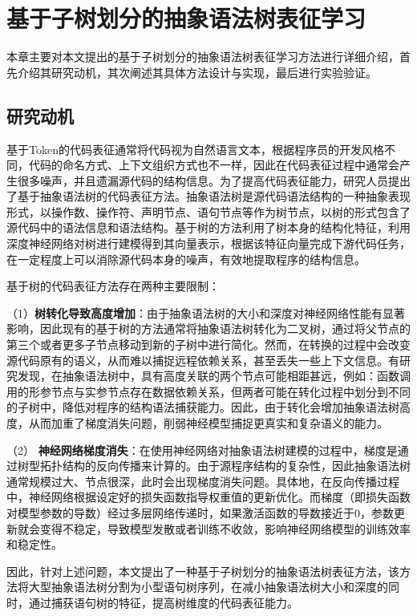 \chapter{基于子树划分的抽象语法树表征学习}
\label{chap:AST}
本章主要对本文提出的基于子树划分的抽象语法树表征学习方法进行详细介绍，首先介绍其研究动机，其次阐述其具体方法设计与实现，最后进行实验验证。

\section{研究动机}
\label{sec:ASTMotivation}
基于Token的代码表征通常将代码视为自然语言文本，根据程序员的开发风格不同，代码的命名方式、上下文组织方式也不一样，因此在代码表征过程中通常会产生很多噪声，并且遗漏源代码的结构信息。为了提高代码表征能力，研究人员提出了基于抽象语法树的代码表征方法。抽象语法树是源代码语法结构的一种抽象表现形式，以操作数、操作符、声明节点、语句节点等作为树节点，以树的形式包含了源代码中的语法信息和语法结构。基于树的方法利用了树本身的结构化特征，利用深度神经网络对树进行建模得到其向量表示，根据该特征向量完成下游代码任务，在一定程度上可以消除源代码本身的噪声，有效地提取程序的结构信息。

基于树的代码表征方法存在两种主要限制：

（1）\textbf{树转化导致高度增加}：由于抽象语法树的大小和深度对神经网络性能有显著影响，因此现有的基于树的方法通常将抽象语法树转化为二叉树，通过将父节点的第三个或者更多子节点移动到新的子树中进行简化。然而，在转换的过程中会改变源代码原有的语义，从而难以捕捉远程依赖关系，甚至丢失一些上下文信息。有研究发现\cite{Allamanis2017LearningTR}，在抽象语法树中，具有高度关联的两个节点可能相距甚远，例如：函数调用的形参节点与实参节点存在数据依赖关系，但两者可能在转化过程中划分到不同的子树中，降低对程序的结构语法捕获能力。因此，由于转化会增加抽象语法树高度，从而加重了梯度消失问题，削弱神经模型捕捉更真实和复杂语义的能力。

（2） \textbf{神经网络梯度消失}：在使用神经网络对抽象语法树建模的过程中，梯度是通过树型拓扑结构的反向传播来计算的。由于源程序结构的复杂性，因此抽象语法树通常规模过大、节点很深，此时会出现梯度消失问题。具体地，在反向传播过程中，神经网络根据设定好的损失函数指导权重值的更新优化。而梯度（即损失函数对模型参数的导数）经过多层网络传递时，如果激活函数的导数接近于0，参数更新就会变得不稳定，导致模型发散或者训练不收敛，影响神经网络模型的训练效率和稳定性。

因此，针对上述问题，本文提出了一种基于子树划分的抽象语法树表征方法，该方法将大型抽象语法树分割为小型语句树序列，在减小抽象语法树大小和深度的同时，通过捕获语句树的特征，提高树维度的代码表征能力。

